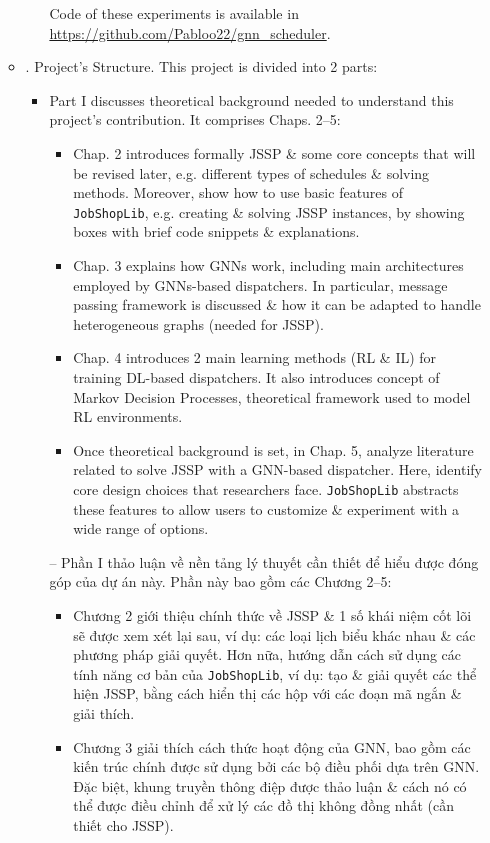 \documentclass{article}
\begin{document}
\begin{itemize}
\begin{itemize}
\begin{itemize}
            Code of these experiments is available in \url{https://github.com/Pabloo22/gnn_scheduler}.
        \end{itemize}
        \item {. Project's Structure.} This project is divided into 2 parts:
        \begin{itemize}
            \item Part I discusses theoretical background needed to understand this project's contribution. It comprises Chaps. 2--5:
            \begin{itemize}
                \item Chap. 2 introduces formally JSSP \& some core concepts that will be revised later, e.g. different types of schedules \& solving methods. Moreover, show how to use basic features of {\tt JobShopLib}, e.g. creating \& solving JSSP instances, by showing boxes with brief code snippets \& explanations.
                \item Chap. 3 explains how GNNs work, including main architectures employed by GNNs-based dispatchers. In particular, message passing framework is discussed \& how it can be adapted to handle heterogeneous graphs (needed for JSSP).
                \item Chap. 4 introduces 2 main learning methods (RL \& IL) for training DL-based dispatchers. It also introduces concept of Markov Decision Processes, theoretical framework used to model RL environments.
                \item Once theoretical background is set, in Chap. 5, analyze literature related to solve JSSP with a GNN-based dispatcher. Here, identify core design choices that researchers face. {\tt JobShopLib} abstracts these features to allow users to customize \& experiment with a wide range of options.
            \end{itemize}
            -- Phần I thảo luận về nền tảng lý thuyết cần thiết để hiểu được đóng góp của dự án này. Phần này bao gồm các Chương 2--5:
            \begin{itemize}
                \item Chương 2 giới thiệu chính thức về JSSP \& 1 số khái niệm cốt lõi sẽ được xem xét lại sau, ví dụ: các loại lịch biểu khác nhau \& các phương pháp giải quyết. Hơn nữa, hướng dẫn cách sử dụng các tính năng cơ bản của {\tt JobShopLib}, ví dụ: tạo \& giải quyết các thể hiện JSSP, bằng cách hiển thị các hộp với các đoạn mã ngắn \& giải thích.
                \item Chương 3 giải thích cách thức hoạt động của GNN, bao gồm các kiến trúc chính được sử dụng bởi các bộ điều phối dựa trên GNN. Đặc biệt, khung truyền thông điệp được thảo luận \& cách nó có thể được điều chỉnh để xử lý các đồ thị không đồng nhất (cần thiết cho JSSP).

\end{itemize}
\end{itemize}
\end{itemize}
\end{itemize}
\end{document}
